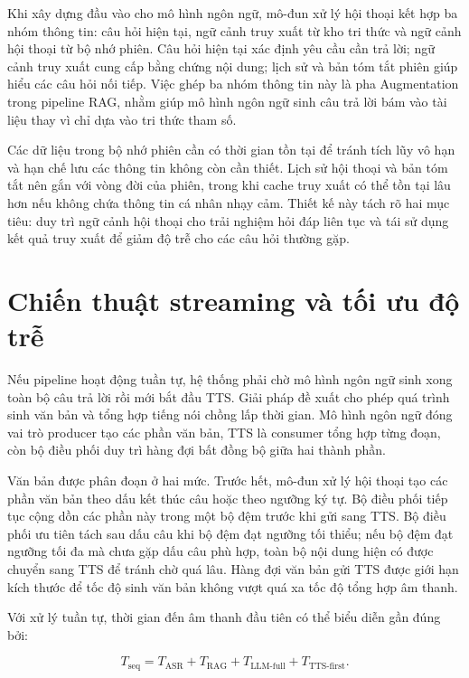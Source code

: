 \documentclass[a4paper,13pt,twoside]{report}
\begin{document}
Khi xây dựng đầu vào cho mô hình ngôn ngữ, mô-đun xử lý hội thoại kết hợp ba nhóm thông tin: câu hỏi hiện tại, ngữ cảnh truy xuất từ kho tri thức và ngữ cảnh hội thoại từ bộ nhớ phiên. Câu hỏi hiện tại xác định yêu cầu cần trả lời; ngữ cảnh truy xuất cung cấp bằng chứng nội dung; lịch sử và bản tóm tắt phiên giúp hiểu các câu hỏi nối tiếp. Việc ghép ba nhóm thông tin này là pha Augmentation trong pipeline RAG, nhằm giúp mô hình ngôn ngữ sinh câu trả lời bám vào tài liệu thay vì chỉ dựa vào tri thức tham số.

Các dữ liệu trong bộ nhớ phiên cần có thời gian tồn tại để tránh tích lũy vô hạn và hạn chế lưu các thông tin không còn cần thiết. Lịch sử hội thoại và bản tóm tắt nên gắn với vòng đời của phiên, trong khi cache truy xuất có thể tồn tại lâu hơn nếu không chứa thông tin cá nhân nhạy cảm. Thiết kế này tách rõ hai mục tiêu: duy trì ngữ cảnh hội thoại cho trải nghiệm hỏi đáp liên tục và tái sử dụng kết quả truy xuất để giảm độ trễ cho các câu hỏi thường gặp.

\section{Chiến thuật streaming và tối ưu độ trễ}

Nếu pipeline hoạt động tuần tự, hệ thống phải chờ mô hình ngôn ngữ sinh xong toàn bộ câu trả lời rồi mới bắt đầu TTS. Giải pháp đề xuất cho phép quá trình sinh văn bản và tổng hợp tiếng nói chồng lấp thời gian. Mô hình ngôn ngữ đóng vai trò producer tạo các phần văn bản, TTS là consumer tổng hợp từng đoạn, còn bộ điều phối duy trì hàng đợi bất đồng bộ giữa hai thành phần.

Văn bản được phân đoạn ở hai mức. Trước hết, mô-đun xử lý hội thoại tạo các phần văn bản theo dấu kết thúc câu hoặc theo ngưỡng ký tự. Bộ điều phối tiếp tục cộng dồn các phần này trong một bộ đệm trước khi gửi sang TTS. Bộ điều phối ưu tiên tách sau dấu câu khi bộ đệm đạt ngưỡng tối thiểu; nếu bộ đệm đạt ngưỡng tối đa mà chưa gặp dấu câu phù hợp, toàn bộ nội dung hiện có được chuyển sang TTS để tránh chờ quá lâu. Hàng đợi văn bản gửi TTS được giới hạn kích thước để tốc độ sinh văn bản không vượt quá xa tốc độ tổng hợp âm thanh.

Với xử lý tuần tự, thời gian đến âm thanh đầu tiên có thể biểu diễn gần đúng bởi:

\begin{equation}
    T_{\mathrm{seq}}
    =
    T_{\mathrm{ASR}}
    +T_{\mathrm{RAG}}
    +T_{\mathrm{LLM\text{-}full}}
    +T_{\mathrm{TTS\text{-}first}}.
\end{equation}
\end{document}
